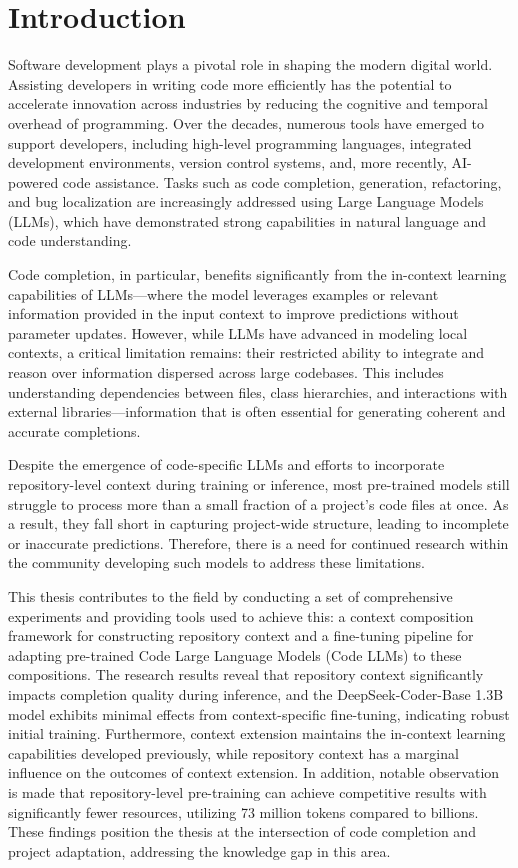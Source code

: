 \chapter*{Introduction}

Software development plays a pivotal role in shaping the modern digital world. Assisting developers in writing code more efficiently has the potential to accelerate innovation across industries by reducing the cognitive and temporal overhead of programming. Over the decades, numerous tools have emerged to support developers, including high-level programming languages, integrated development environments, version control systems, and, more recently, AI-powered code assistance. Tasks such as code completion, generation, refactoring, and bug localization are increasingly addressed using Large Language Models (LLMs), which have demonstrated strong capabilities in natural language and code understanding.

Code completion, in particular, benefits significantly from the in-context learning capabilities of LLMs---where the model leverages examples or relevant information provided in the input context to improve predictions without parameter updates. However, while LLMs have advanced in modeling local contexts, a critical limitation remains: their restricted ability to integrate and reason over information dispersed across large codebases. This includes understanding dependencies between files, class hierarchies, and interactions with external libraries---information that is often essential for generating coherent and accurate completions.

Despite the emergence of code-specific LLMs and efforts to incorporate repository-level context during training or inference, most pre-trained models still struggle to process more than a small fraction of a project's code files at once. As a result, they fall short in capturing project-wide structure, leading to incomplete or inaccurate predictions. Therefore, there is a need for continued research within the community developing such models to address these limitations.

This thesis contributes to the field by conducting a set of comprehensive experiments and providing tools used to achieve this: a context composition framework for constructing repository context and a fine-tuning pipeline for adapting pre-trained Code Large Language Models (Code LLMs) to these compositions. The research results reveal that repository context significantly impacts completion quality during inference, and the DeepSeek-Coder-Base 1.3B model exhibits minimal effects from context-specific fine-tuning, indicating robust initial training. Furthermore, context extension maintains the in-context learning capabilities developed previously, while repository context has a marginal influence on the outcomes of context extension. In addition, notable observation is made that repository-level pre-training can achieve competitive results with significantly fewer resources, utilizing 73 million tokens compared to billions. These findings position the thesis at the intersection of code completion and project adaptation, addressing the knowledge gap in this area.

